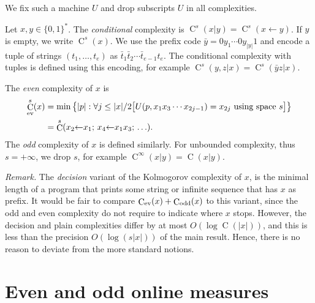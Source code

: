 \documentclass[runningheads]{llncs}
\DeclareMathOperator{\C}{C} \newcommand{\Cev}{\C_\textnormal{ev}} \newcommand{\Codd}{\C_\textnormal{odd}}
\newcommand{\lar}{{\leftarrow}}
\begin{document}
We fix such a machine $U$ and drop subscripts $U$ in all complexities. 

\begin{definition}
  Let $x, y \in \{0,1\}^*$. The {\em conditional} complexity is $\C^s(x|y) = \C^s(x \lar y)$. 
  If $y$ is empty, we write $\C^s(x)$. 
  We use the prefix code $\bar y = 0y_1 \cdots 0y_{|y|}1$ and encode a tuple of strings $(t_1, \ldots, t_e)$ as $\bar t_1 \bar t_2 \cdots \bar t_{e-1} t_e$.
  The conditional complexity with tuples is defined using this encoding, for example $\C^s(y,z|x) = \C^s(\bar y z|x)$. 

  The {\em even} complexity of $x$ is 
  \begin{align*}
    \Cev^{s}(x) 
    &= \min \big\{|p|: \forall j \le |x|/2\big[U(p, x_1 x_3 \cdots x_{2j-1}) = x_{2j} \textnormal{ using space } s\big]\big\}\\
    &= \C^s(x_2 \lar x_1; \,x_4 \lar x_1x_3; \,\ldots).
  \end{align*}
  The  {\em odd} complexity of $x$ is defined similarly.  
  For unbounded complexity, thus $s = +\infty$, we drop $s$, for example $\C^{\infty}(x|y) = \C(x|y)$. 
\end{definition}

\medskip
\noindent
{\em Remark.} The  {\em decision} variant of the Kolmogorov complexity of $x$, is the minimal length of a program that prints 
some string or infinite sequence that has $x$ as prefix. It would be fair to compare $\Cev(x) + \Codd(x)$ to this variant, 
since the odd and even complexity do not require to indicate where $x$ stops. 
However, the decision and plain complexities differ by at most $O(\log \C(|x|))$, 
and this is less than the precision $O(\log (s|x|))$ of the main result. Hence, there is no reason to deviate from the more standard notions. 




\section{Even and odd online measures}
\end{document}
